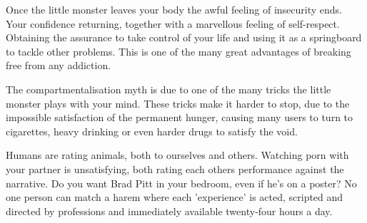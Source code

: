 \documentclass[easypeasy.tex]{subfiles}
\begin{document}
Once the little monster leaves your body the awful feeling of insecurity ends. Your confidence returning, together with a marvellous feeling of self-respect. Obtaining the assurance to take control of your life and using it as a springboard to tackle other problems. This is one of the many great advantages of breaking free from any addiction.

The compartmentalisation myth is due to one of the many tricks the little monster plays with your mind. These tricks make it harder to stop, due to the impossible satisfaction of the permanent hunger, causing many users to turn to cigarettes, heavy drinking or even harder drugs to satisfy the void.

Humans are rating animals, both to ourselves and others. Watching porn with your partner is unsatisfying, both rating each others performance against the narrative. Do you want Brad Pitt in your bedroom, even if he's on a poster? No one person can match a harem where each 'experience' is acted, scripted and directed by professions and immediately available twenty-four hours a day.
\end{document}
